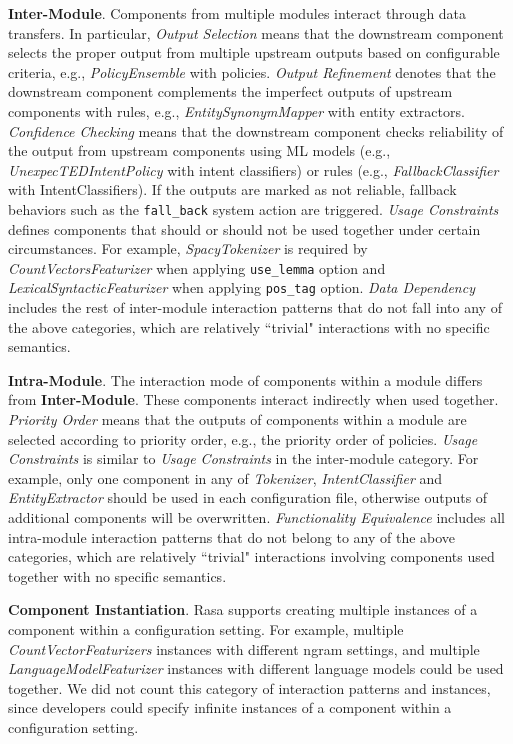 \textbf{Inter-Module}. Components from multiple modules interact through data transfers. In particular, \textit{Output Selection} means that the downstream component selects the proper output from multiple upstream outputs based on configurable criteria, e.g., \textit{PolicyEnsemble} with policies. 
\textit{Output Refinement} denotes that the downstream component complements the imperfect outputs of upstream components with rules, e.g., 
\textit{EntitySynonymMapper} with entity extractors. \textit{Confidence Checking} means that the downstream component checks reliability of the output from upstream components using ML models (e.g., \textit{UnexpecTEDIntentPolicy} with intent classifiers) or rules (e.g., \textit{FallbackClassifier} with IntentClassifiers). If the outputs are marked as not reliable, fallback behaviors such as the \texttt{fall\_back} system action are triggered. 
\textit{Usage Constraints} defines components that should or should not be used together under certain circumstances. For example, \textit{SpacyTokenizer} is required by \textit{CountVectorsFeaturizer} when applying \texttt{use\_lemma} option and \textit{LexicalSyntacticFeaturizer} when applying \texttt{pos\_tag} option. \textit{Data Dependency} includes the rest of inter-module interaction patterns that do not fall into any of the above categories, which are relatively ``trivial" interactions with no specific semantics.

\textbf{Intra-Module}. The interaction mode of components within a module differs from \textbf{Inter-Module}. These components interact indirectly when used together. 
\textit{Priority Order} means that the outputs of components within a module are selected according to priority order, e.g., the priority order of policies.
\textit{Usage Constraints} is similar to \textit{Usage Constraints} in the inter-module category. For example, only one component in any of \textit{Tokenizer}, \textit{IntentClassifier} and \textit{EntityExtractor} should be used in each configuration file, otherwise outputs of additional components will be overwritten.  \textit{Functionality Equivalence} includes all intra-module interaction patterns that do not belong to any of the above categories, which are relatively ``trivial" interactions involving components used together with no specific semantics.

\textbf{Component Instantiation}. Rasa supports creating multiple instances of a component within a configuration setting. For example, multiple \textit{CountVectorFeaturizers} instances with different ngram settings, and multiple \textit{LanguageModelFeaturizer} instances with different language models could be used together. We did not count this category of interaction patterns and instances, since developers could specify infinite instances of a component within a configuration setting.

